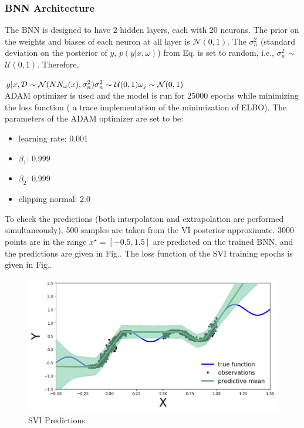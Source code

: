 \documentclass[11pt,a4paper]{article}
\begin{document}
\subsubsection{BNN Architecture}

The BNN is designed to have 2 hidden layers, each with 20 neurons. The prior on the weights and biases of each neuron at all layer is $\mathcal{N}(0,1)$. The $\sigma_n ^2$ (standard deviation on the posterior of $y$, $p(y|x, \omega)$) from Eq.\fbox{\ref{eq:1}} is set to random, i.e., $\sigma_n ^2$ $\sim$ $\mathcal{U}(0,1)$. 
Therefore,

\begin{math}
    y|x, \mathcal{D} \sim \mathcal{N}( NN_{\omega}(x), \sigma_n ^2 ) \\ 
    \sigma_n ^2 \sim \mathcal{U}(0,1) \\
    \omega_j \sim \mathcal{N}(0,1) 
\end{math} \\
ADAM optimizer is used and the model is run for 25000 epochs while minimizing the loss function ( a trace implementation of the minimization of ELBO). The parameters of the ADAM optimizer are set to be:

\begin{itemize}
    \item learning rate: 0.001
    \item $\beta_1$: 0.999
    \item $\beta_2$: 0.999
    \item clipping normal: 2.0
\end{itemize}

To check the predictions (both interpolation and extrapolation are performed simultaneously), 500 samples are taken from the VI posterior approximate. 3000 points are in the range $x^{\star} = [-0.5,1.5]$ are predicted on the trained BNN, and the predictions are given in Fig.\fbox{\ref{fig:svi preds}}. The loss function of the SVI training epochs is given in Fig.\fbox{\ref{fig:svi loss function}}.

\begin{figure}[h!]
    \centering
    \includegraphics[scale=0.5]{svi preds.png}
    \caption{SVI Predictions}
    \label{fig:svi preds}
\end{figure}
\end{document}
